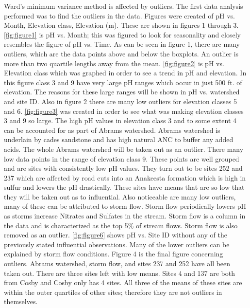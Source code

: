 \documentclass[11pt]{article} %
\begin{document}
Ward’s minimum variance method is affected by outliers.  The first data analysis performed was to find the outliers in the data.  Figures were created of pH vs. Month, Elevation class, Elevation (m).  These are shown in figures 1 through 3.   \autoref{fig:figure1} is pH vs. Month; this was figured to look for seasonality and closely resembles the figure of pH vs. Time.  As can be seen in figure 1, there are many outliers, which are the data points above and below the boxplots.  An outlier is more than two quartile lengths away from the mean. \autoref{fig:figure2} is pH vs. Elevation class which was graphed in order to see a trend in pH and elevation.  In this figure class 3 and 9 have very large pH ranges which occur in just 500 ft. of elevation.  The reasons for these large ranges will be shown in pH vs. watershed and site ID.  Also in figure 2 there are many low outliers for elevation classes 5 and 6.  \autoref{fig:figure3} was created in order to see what was making elevation classes 3 and 9 so large.  The high pH values in elevation class 3 and to some extent 4 can be accounted for as part of Abrams watershed.  Abrams watershed is underlain by cades sandstone and has high natural ANC to buffer any added acids.  The whole Abrams watershed will be taken out as an outlier.  There many low data points in the range of elevation class 9.  These points are well grouped and are sites with consistently low pH values.  They turn out to be sites 252 and 237 which are affected by road cuts into an Anakeesta formation which is high in sulfur and  lowers the pH drastically.  These sites have means that are so low that they will be taken out as to influential.    Also noticeable are many low outliers, many of these can be attributed to storm flow.  Storm flow periodically lowers pH as storms increase Nitrates and Sulfates in the stream.  Storm flow is a column in the data and is characterized as the top 5$\%$ of stream flows.  Storm flow is also removed as an outlier. \autoref{fig:figure6} shows pH vs. Site ID without any of the previously stated influential observations.  Many of the lower outliers can be explained by storm flow conditions.  Figure 4 is the final figure concerning outliers.  Abrams watershed, storm flow, and sites 237 and 252 have all been taken out.  There are three sites left with low means.  Sites 4 and 137 are both from Cosby and Cosby only has 4 sites.  All three of the means of these sites are within the outer quartiles of other sites; therefore they are not outliers in themselves.
    
\end{document}

